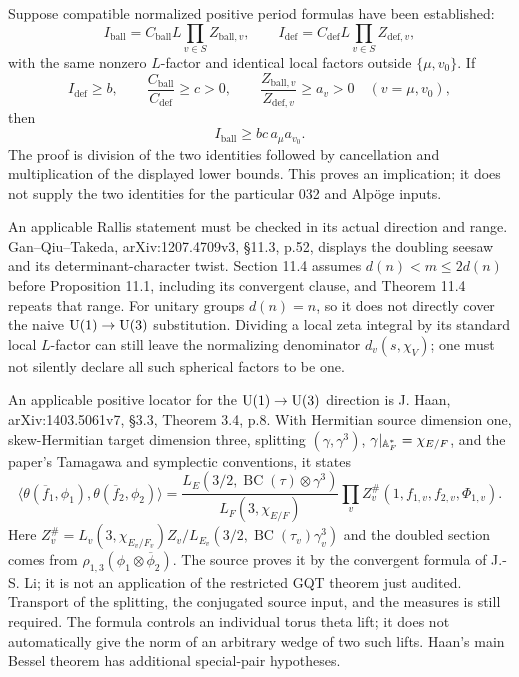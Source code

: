 \documentclass[11pt]{article}
\theoremstyle{definition}\newtheorem{definition}[theorem]{Definition}\newtheorem{remark}[theorem]{Remark}
\begin{document}
Suppose compatible normalized positive period formulas have been established:
\[
 I_{\mathrm{ball}}=C_{\mathrm{ball}}L\prod_{v\in S}Z_{\mathrm{ball},v},
 \qquad
 I_{\mathrm{def}}=C_{\mathrm{def}}L\prod_{v\in S}Z_{\mathrm{def},v},
\]
with the same nonzero $L$-factor and identical local factors outside
$\{\mu,v_0\}$. If
\[
 I_{\mathrm{def}}\geq b,\qquad
 \frac{C_{\mathrm{ball}}}{C_{\mathrm{def}}}\geq c>0,
 \qquad \frac{Z_{\mathrm{ball},v}}{Z_{\mathrm{def},v}}\geq a_v>0
 \quad(v=\mu,v_0),
\]
then
\[
 I_{\mathrm{ball}}\geq bc\,a_\mu a_{v_0}.
\]
The proof is division of the two identities followed by cancellation and multiplication of the displayed lower bounds. This proves an implication; it does not supply the two identities for the particular 032 and Alp\"oge inputs.

An applicable Rallis statement must be checked in its actual direction and range. Gan--Qiu--Takeda, arXiv:1207.4709v3, \S11.3, p.52, displays the doubling seesaw and its determinant-character twist. Section 11.4 assumes $d(n)<m\leq2d(n)$ before Proposition 11.1, including its convergent clause, and Theorem 11.4 repeats that range. For unitary groups $d(n)=n$, so it does not directly cover the naive $\operatorname{U}(1)\to\operatorname{U}(3)$ substitution. Dividing a local zeta integral by its standard local $L$-factor can still leave the normalizing denominator $d_v(s,\chi_V)$; one must not silently declare all such spherical factors to be one.

An applicable positive locator for the $\operatorname{U}(1)\to\operatorname{U}(3)$ direction is J. Haan, arXiv:1403.5061v7, \S3.3, Theorem 3.4, p.8. With Hermitian source dimension one, skew-Hermitian target dimension three, splitting $(\gamma,\gamma^3)$, $\gamma|_{\mathbb A_F^*}=\chi_{E/F}$, and the paper's Tamagawa and symplectic conventions, it states
\[
 \langle\theta(\overline f_1,\phi_1),\theta(\overline f_2,\phi_2)\rangle
 =\frac{L_E(3/2,\operatorname{BC}(\tau)\otimes\gamma^3)}
        {L_F(3,\chi_{E/F})}
   \prod_v Z_v^{\#}(1,f_{1,v},f_{2,v},\Phi_{1,v}).
\]
Here $Z_v^{\#}=L_v(3,\chi_{E_v/F_v})Z_v/L_{E_v}(3/2,\operatorname{BC}(\tau_v)\gamma_v^3)$ and the doubled section comes from $\rho_{1,3}(\phi_1\otimes\overline\phi_2)$. The source proves it by the convergent formula of J.-S. Li; it is not an application of the restricted GQT theorem just audited. Transport of the splitting, the conjugated source input, and the measures is still required. The formula controls an individual torus theta lift; it does not automatically give the norm of an arbitrary wedge of two such lifts. Haan's main Bessel theorem has additional special-pair hypotheses.
\end{document}
